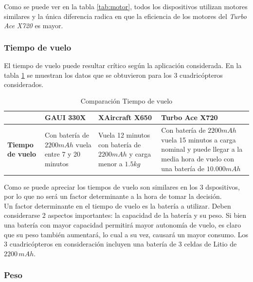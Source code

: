 \documentclass[main]{subfiles}
\begin{document}
	Como se puede ver en la tabla \ref{tab:motor}, todos los dispositivos utilizan motores similares y la \'unica diferencia radica en que la eficiencia de los motores del \emph{Turbo Ace X720} es mayor.

\subsubsection*{Tiempo de vuelo}

	El tiempo de vuelo puede resultar cr\'itico seg\'un la aplicaci\'on considerada. En la tabla \ref{tab:tiempo} se muestran los datos que se obtuvieron para los 3 cuadric\'opteros considerados.

\begin{table}[H]
\begin{tabular}{p{40pt}|p{80pt}|p{130pt}|p{130pt}|} 
\cline{2-4}
& \cellcolor[gray]{0.8} \textbf{GAUI 330X} 
& \cellcolor[gray]{0.8} \textbf{XAircraft X650} 
& \cellcolor[gray]{0.8} \textbf{Turbo Ace X720} \\ \cline{2-4} \hline
\multicolumn{1}{|p{40pt}|}{\cellcolor[gray]{0.8}\textbf{Tiempo de vuelo}} 
& Con bater\'ia de $2200 mAh$ vuela entre 7 y 20 minutos & Vuela 12 minutos con bater\'ia de $2200mAh$ y carga menor a $1.5kg$ & Con bater\'ia de $2200mAh$ vuela 15 minutos a carga nominal y puede llegar a la media hora de vuelo con una bater\'ia de $10.000mAh$ \\ \hline
\end{tabular}
\caption{Comparaci\'on Tiempo de vuelo}
\label{tab:tiempo}
\end{table}

	Como se puede apreciar los tiempos de vuelo son similares en los 3 dspositivos, por lo que no ser\'a un factor determinante a la hora de tomar la decisi\'on.\\

	Un factor determinante en el tiempo de vuelo es la bater\'ia a utilizar. Deben considerarse 2 aspectos importantes: la capacidad de la bater\'ia y su peso. Si bien una bater\'ia con mayor capacidad permitir\'a mayor autonom\'ia de vuelo, es claro que su peso tambi\'en aumentar\'a, lo cual a su vez, causar\'a un mayor consumo. Los 3 cuadric\'opteros en consideraci\'on incluyen una bater\'ia de 3 celdas de Litio de $2200 \, mAh$.

\subsubsection*{Peso}
\end{document}
